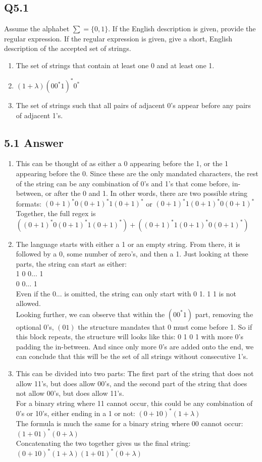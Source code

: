 \documentclass{article}
\begin{document}
\subsection*{Q5.1}
Assume the alphabet $\sum=\{0,1\}$. If the English description is given, provide the regular expression. If the regular expression is given, give a short, English description of the accepted set of strings.
\begin{enumerate}[label=\alph*.]
    \item The set of strings that contain at least one 0 and at least one 1.
    \item $(1+\lambda)(00^*1)^*0^*$
    \item The set of strings such that all pairs of adjacent 0's appear before any pairs of adjacent 1's.
\end{enumerate}
\newpage
\subsection*{5.1 Answer}
\begin{enumerate}[label=\alph*.]
    \item This can be thought of as either a 0 appearing before the 1, or the 1 appearing before the 0. Since these are the only mandated characters, the rest of the string can be any combination of 0's and 1's that come before, in-between, or after the 0 and 1. In other words, there are two possible string formats: $(0+1)^*0(0+1)^*1(0+1)^*$ or $(0+1)^*1(0+1)^*0(0+1)^*$
    \\ Together, the full regex is $((0+1)^*0(0+1)^*1(0+1)^*)+((0+1)^*1(0+1)^*0(0+1)^*)$
    \item The language starts with either a 1 or an empty string. From there, it is followed by a 0, some number of zero's, and then a 1. Just looking at these parts, the string can start as either:
    \\ 1 0 0... 1 
    \\ 0 0... 1
    \\ Even if the 0... is omitted, the string can only start with 0 1. 1 1 is not allowed.
    \\ Looking further, we can observe that within the $(00^*1)$ part, removing the optional 0's, $(01)$ the structure mandates that 0 must come before 1. So if this block repeats, the structure will looks like this: 0 1 0 1 with more 0's padding the in-between. And since only more 0's are added onto the end, we can conclude that this will be the set of all strings without consecutive 1's.
    \item This can be divided into two parts: The first part of the string that does not allow 11's, but does allow 00's, and the second part of the string that does not allow 00's, but does allow 11's.
    \\ For a binary string where 11 cannot occur, this could be any combination of 0's or 10's, either ending in a 1 or not: $(0+10)^*(1+\lambda)$
    \\ The formula is much the same for a binary string where 00 cannot occur: $(1+01)^*(0+\lambda)$
    \\ Concatenating the two together gives us the final string: $(0+10)^*(1+\lambda)(1+01)^*(0+\lambda)$
\end{enumerate}
\newpage
\end{document}
